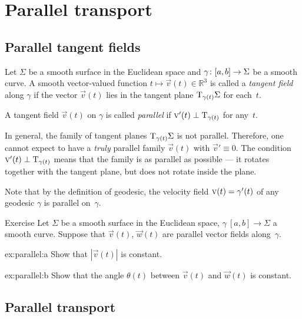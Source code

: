 \chapter{Parallel transport}
\label{chap:parallel-transport}

\section{Parallel tangent fields}

Let $\Sigma$ be a smooth surface in the Euclidean space and $\gamma\:[a,b]\z\to \Sigma$ be a smooth curve.
A smooth vector-valued function $t\mapsto {\vec v}(t) \in \mathbb{R}^3$ is called a \emph{tangent field} along $\gamma$ if
the vector ${\vec v}(t)$ lies in the tangent plane $\mathrm{T}_{\gamma(t)}\Sigma$ for each~$t$.

A tangent field ${\vec v}(t)$ on $\gamma$ is called \emph{parallel} if ${\text{\sc{v}}}'(t)\perp\mathrm{T}_{\gamma(t)}$ for any~$t$.

In general, the family of tangent planes $\mathrm{T}_{\gamma(t)}\Sigma$ is not parallel.
Therefore, one cannot expect to have a {}\emph{truly} parallel family ${\vec v}(t)$ with ${\vec v}'\equiv 0$.
The condition ${\text{\sc{v}}}'(t)\perp\mathrm{T}_{\gamma(t)}$ means that the family is as parallel as possible --- it rotates together with the tangent plane, but does not rotate inside the plane.

Note that by the definition of geodesic, the velocity field ${\vec v}(t)\z=\gamma'(t)$ of any geodesic $\gamma$ is parallel on~$\gamma$.

\begin{thm}{Exercise}\label{ex:parallel}
Let $\Sigma$ be a smooth surface in the Euclidean space, 
$\gamma\:[a,b]\to \Sigma$ a smooth curve.
Suppose that ${\vec v}(t)$, $\vec w(t)$ are parallel vector fields along~$\gamma$.

\begin{subthm}{ex:parallel:a} Show that $|{\vec v}(t)|$ is constant.
\end{subthm}

\begin{subthm}{ex:parallel:b} Show that the angle $\theta(t)$ between ${\vec v}(t)$ and $\vec w(t)$ is constant.
\end{subthm}

\end{thm}

\section{Parallel transport}

